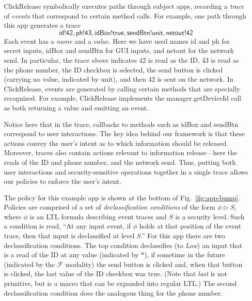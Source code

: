 \documentclass{llncs}
\newcommand{\code}[1]{\textsf{#1}} %
\newcommand{\toolname}{ClickRelease\xspace}
\newcommand{\tfuture}{\mathcal{F}}
\begin{document}
\toolname{} symbolically executes paths through subject apps, recording a
\emph{trace} of \emph{events} that correspond to certain method calls.
For example, one path through this app generates a trace
\begin{displaymath}
   \code{id!42}, \code{ph!43}, \code{idBox!true},
    \code{sendBtn!unit}, \code{netout!}\code{42}
\end{displaymath}
Each event has a \emph{name} and a \emph{value}. Here we have used
names \code{id} and \code{ph} for secret inputs, \code{idBox} and
\code{sendBtn} for GUI inputs, and \code{netout} for the network
send.  In particular, the trace above indicates 42 is read as the ID,
43 is read as the phone number, the ID checkbox is selected, the send
button is clicked (carrying no value, indicated by
\code{unit}), and then 42 is sent on the network. In \toolname{},
events are generated by calling certain methods that are specially
recognized. For example, \toolname{} implements the
\code{manager.getDeviceId} call as both returning a value and emitting
an event.

Notice here that in the trace, callbacks to methods such as
\code{idBox} and \code{sendBtn} correspond to user
interactions. The key idea behind our framework is that these actions
convey the user's intent as to which information should be
released. Moreover, traces also contain actions relevant to
information release---here the reads of the ID and phone number, and
the network send. Thus, putting both user interactions and
security-sensitive operations together in a single trace allows
our policies to enforce the user's intent.

The policy for
this example app is shown at the bottom of Fig.~\ref{fig:app-bump}.
Policies are comprised of a set of \emph{declassification
  conditions} of the form $\phi \rhd S$, where $\phi$ is an LTL
formula describing event traces and $S$ is a security level.  Such a
condition is read, ``At any input event, if $\phi$ holds at that
position of the event trace, then that input is declassified at level
$S$.''  For this app there are two declassification conditions. The
top condition declassifies (to \emph{Low}) an input that is a
read of the ID at any value (indicated by $\ast$), if
sometime in the future (indicated by the $\tfuture$ modality) the send
button is clicked and, when that button is clicked, the last value of
the ID checkbox was \code{true}. (Note that \emph{last} is not
primitive, but is a macro that can be expanded into regular LTL.)  The
second declassification condition does the analogous thing for the
phone number.
\end{document}
